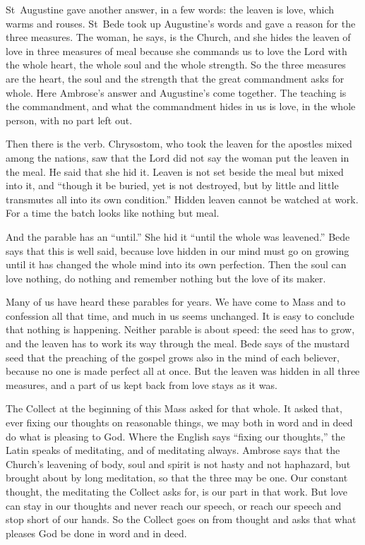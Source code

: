 St~Augustine gave another answer, in a few words: the leaven is love, which
warms and rouses. St~Bede took up Augustine's words and gave a reason for the
three measures. The woman, he says, is the Church, and she hides the leaven of
love in three measures of meal because she commands us to love the Lord with
the whole heart, the whole soul and the whole strength. So the three measures
are the heart, the soul and the strength that the great commandment asks for
whole. Here Ambrose's answer and Augustine's come together. The teaching is the
commandment, and what the commandment hides in us is love, in the whole
person, with no part left out.

Then there is the verb. Chrysostom, who took the leaven for the apostles mixed
among the nations, saw that the Lord did not say the woman put the leaven in
the meal. He said that she hid it. Leaven is not set beside the meal but mixed
into it, and ``though it be buried, yet is not destroyed, but by little and
little transmutes all into its own condition.'' Hidden leaven cannot be
watched at work. For a time the batch looks like nothing but meal.

And the parable has an ``until.'' She hid it ``until the whole was leavened.''
Bede says that this is well said, because love hidden in our mind must go on
growing until it has changed the whole mind into its own perfection. Then the
soul can love nothing, do nothing and remember nothing but the love of its
maker.

Many of us have heard these parables for years. We have come to Mass and to
confession all that time, and much in us seems unchanged. It is easy to
conclude that nothing is happening. Neither parable is about speed: the seed
has to grow, and the leaven has to work its way through the meal. Bede says of
the mustard seed that the preaching of the gospel grows also in the mind of
each believer, because no one is made perfect all at once. But the leaven was
hidden in all three measures, and a part of us kept back from love stays as it
was.

The Collect at the beginning of this Mass asked for that whole. It asked that,
ever fixing our thoughts on reasonable things, we may both in word and in deed
do what is pleasing to God. Where the English says ``fixing our thoughts,''
the Latin speaks of meditating, and of meditating always. Ambrose says that
the Church's leavening of body, soul and spirit is not hasty and not
haphazard, but brought about by long meditation, so that the three may be one.
Our constant thought, the meditating the Collect asks for, is our part in that
work. But love can stay in our thoughts and never reach our speech, or reach
our speech and stop short of our hands. So the Collect goes on from thought
and asks that what pleases God be done in word and in deed.

